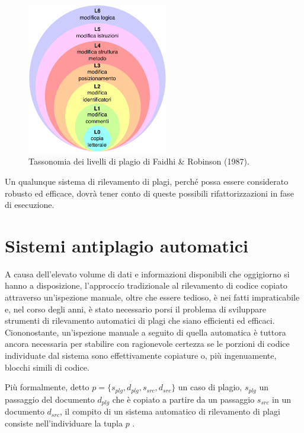\begin{figure}[h]
    \centering
    \includegraphics[width=0.55\textwidth]{resources/img/01-levels-of-plagiarism.pdf}
    \caption{Tassonomia dei livelli di plagio di Faidhi \& Robinson (1987).}
    \label{img:01-levels-of-plagiarism}
\end{figure}

Un qualunque sistema di rilevamento di plagi, perché possa essere considerato robusto ed efficace, dovrà tener conto di queste possibili rifattorizzazioni in fase di esecuzione.

\section{Sistemi antiplagio automatici}
A causa dell'elevato volume di dati e informazioni disponibili che oggigiorno si hanno a disposizione, l'approccio tradizionale al rilevamento di codice copiato attraverso un'ispezione manuale, oltre che essere tedioso, è nei fatti impraticabile e, nel corso degli anni, è stato necessario porsi il problema di sviluppare strumenti di rilevamento automatici di plagi che siano efficienti ed efficaci.
%
Ciononostante, un'ispezione manuale a seguito di quella automatica è tuttora ancora necessaria per stabilire con ragionevole certezza se le porzioni di codice individuate dal sistema sono effettivamente copiature o, più ingenuamente, blocchi simili di codice.

Più formalmente, detto $p = \{s_{plg}, d_{plg}, s_{src}, d_{src}\}$ un caso di plagio, $s_{plg}$ un passaggio del documento $d_{plg}$ che è copiato a partire da un passaggio $s_{src}$ in un documento $d_{src}$, il compito di un sistema automatico di rilevamento di plagi consiste nell'individuare la tupla $p$ \cite{yalcin-et-al-2022}.

